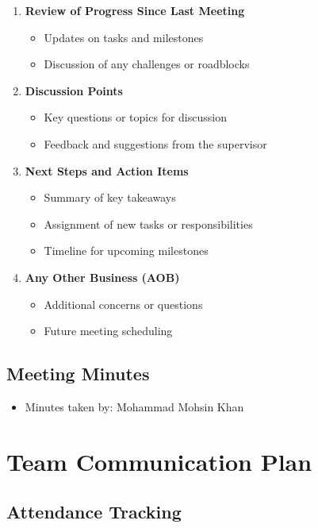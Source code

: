 \documentclass{article}
\begin{document}
\begin{enumerate}
    \item \textbf{Review of Progress Since Last Meeting}
    \begin{itemize}
        \item Updates on tasks and milestones
        \item Discussion of any challenges or roadblocks
    \end{itemize}
    \item \textbf{Discussion Points}
    \begin{itemize}
        \item Key questions or topics for discussion
        \item Feedback and suggestions from the supervisor
    \end{itemize}
    \item \textbf{Next Steps and Action Items}
    \begin{itemize}
        \item Summary of key takeaways
        \item Assignment of new tasks or responsibilities
        \item Timeline for upcoming milestones
    \end{itemize}
    \item \textbf{Any Other Business (AOB)}
    \begin{itemize}
        \item Additional concerns or questions
        \item Future meeting scheduling
    \end{itemize}
\end{enumerate}

\subsection*{Meeting Minutes}

\begin{itemize}
    \item Minutes taken by: Mohammad Mohsin Khan
\end{itemize}



\section{Team Communication Plan}

\subsection{Attendance Tracking}
\end{document}
